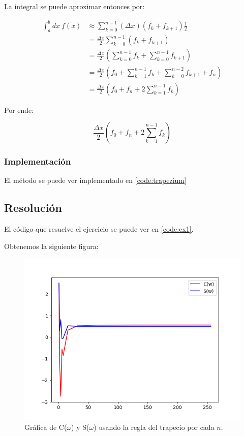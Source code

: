 \newpage 

La integral se puede aproximar entonces por:

\begin{align*}
	\int_{a}^{b} dx ~ f(x)
	&\approx \sum_{k = 0}^{n - 1} (\Delta x)( f_k + f_{k+1} )\frac{1}{2} \\
	&= \frac{\Delta x}{2} \sum_{k = 0}^{n - 1} ( f_k + f_{k+1}) \\
	&= \frac{\Delta x}{2} (\sum_{k = 0}^{n - 1}  f_k + \sum_{k = 0}^{n - 1} f_{k+1}) \\
	&= 
	\frac{\Delta x}{2}
	(
	f_0 + \sum_{k = 1}^{n - 1}  f_k 
	+ \sum_{k = 0}^{n - 2} f_{k+1}
	+ f_n
	) \\
	&= \frac{\Delta x}{2}(f_0 + f_n  + 2 \sum_{k = 1}^{n - 1}  f_k )
\end{align*}


Por ende: 

\begin{equation*}
\boxed{\frac{\Delta x}{2}(f_0 + f_n  + 2 \sum_{k = 1}^{n - 1}  f_k )}
\end{equation*}



\subsubsection{Implementación}

El método se puede ver implementado en \ref{code:trapezium}


\newpage 

\subsection{Resolución}

El código que resuelve el ejercicio se puede ver en \ref{code:ex1}. 

Obtenemos la siguiente figura:

\begin{figure}[H]
	\includegraphics[width=\linewidth]{figures/ex1.png}
	\caption{Gráfica de C($\omega$) y S($\omega$) usando la regla del trapecio por cada $n$.}
	\label{fig:c_s_subdiv}
\end{figure}


